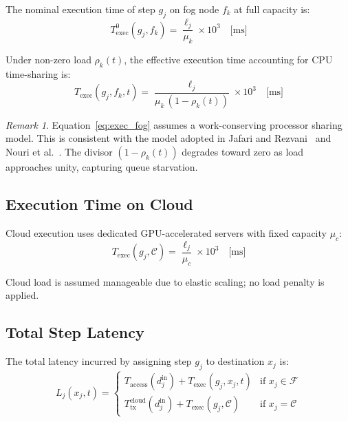 \documentclass[12pt,a4paper]{article}
\theoremstyle{definition}
\theoremstyle{remark}
\newtheorem{remark}{Remark}[section]
\begin{document}
The nominal execution time of step $g_j$ on fog node $f_k$ at full capacity is:
\begin{equation}
  T_{\text{exec}}^{0}(g_j, f_k) = \frac{\ell_j}{\mu_k} \times 10^3 \quad \text{[ms]}
\end{equation}

Under non-zero load $\rho_k(t)$, the effective execution time accounting for
CPU time-sharing is:
\begin{equation}
  T_{\text{exec}}(g_j, f_k, t) = \frac{\ell_j}{\mu_k \, (1 - \rho_k(t))}
  \times 10^3 \quad \text{[ms]}
  \label{eq:exec_fog}
\end{equation}

\begin{remark}
Equation~\eqref{eq:exec_fog} assumes a work-conserving processor sharing model.
This is consistent with the model adopted in Jafari and Rezvani~\cite{jafari2021}
and Nouri et al.~\cite{nouri2024tof}. The divisor $(1 - \rho_k(t))$ degrades
toward zero as load approaches unity, capturing queue starvation.
\end{remark}

\subsection{Execution Time on Cloud}

Cloud execution uses dedicated GPU-accelerated servers with fixed capacity $\mu_c$:
\begin{equation}
  T_{\text{exec}}(g_j, \mathcal{C}) = \frac{\ell_j}{\mu_c} \times 10^3
  \quad \text{[ms]}
  \label{eq:exec_cloud}
\end{equation}

Cloud load is assumed manageable due to elastic scaling; no load penalty is applied.

\subsection{Total Step Latency}

The total latency incurred by assigning step $g_j$ to destination $x_j$ is:
\begin{equation}
  L_j(x_j, t) =
  \begin{cases}
    T_{\text{access}}(d_j^{\text{in}}) + T_{\text{exec}}(g_j, x_j, t)
    & \text{if } x_j \in \mathcal{F} \\[6pt]
    T_{\text{tx}}^{\text{cloud}}(d_j^{\text{in}}) + T_{\text{exec}}(g_j, \mathcal{C})
    & \text{if } x_j = \mathcal{C}
  \end{cases}
  \label{eq:step_latency}
\end{equation}
\end{document}
